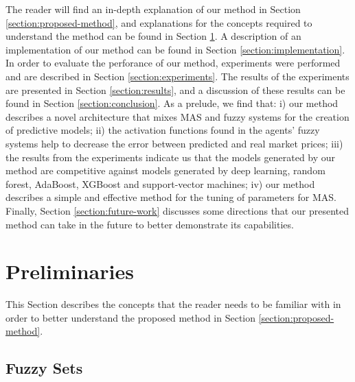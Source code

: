 \documentclass{ieeeaccess}
\begin{document}
The reader will find an in-depth explanation of our method in Section
\ref{section:proposed-method}, and explanations for the concepts
required to understand the method can be found in Section
\ref{section:preliminaries}. A description of an implementation of our method can be
found in Section \ref{section:implementation}. In order to evaluate
the perforance of our method, experiments were performed and are
described in Section \ref{section:experiments}. The results of the
experiments are presented in Section \ref{section:results}, and a
discussion of these results can be found in Section
\ref{section:conclusion}. As a prelude, we find that: i) our method
describes a novel architecture that mixes MAS and fuzzy systems for
the creation of predictive models; ii) the activation functions found
in the agents' fuzzy systems help to decrease the error between
predicted and real market prices; iii) the results from the
experiments indicate us that the models generated by our method are
competitive against models generated by deep learning, random forest,
AdaBoost, XGBoost and support-vector machines; iv) our method
describes a simple and effective method for the tuning of parameters
for MAS. Finally, Section \ref{section:future-work}
discusses some directions that our presented method can take in the
future to better demonstrate its capabilities.

\section{Preliminaries}
\label{section:preliminaries}
%

This Section describes the concepts that the reader needs to be familiar with in
order to better understand the proposed method in Section
\ref{section:proposed-method}.%
\subsection{Fuzzy Sets}
\label{subsection:fuzzy-sets}
\end{document}
